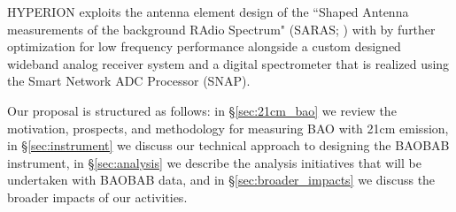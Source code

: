 \documentclass[12pt]{amsart}
\begin{document}
HYPERION exploits the antenna element design of the ``Shaped Antenna measurements of the background RAdio Spectrum" (SARAS; ) with by further optimization for low frequency performance alongside a custom designed wideband analog receiver system and a digital spectrometer that is realized using the Smart Network ADC Processor (SNAP).   




 











Our proposal is structured as follows: 
in \S\ref{sec:21cm_bao} we review the motivation, prospects, and methodology for measuring BAO with 21cm emission,
in \S\ref{sec:instrument} we discuss our technical approach to designing the BAOBAB instrument,
in \S\ref{sec:analysis} we describe the analysis initiatives that will be undertaken with BAOBAB data,
and in \S\ref{sec:broader_impacts} we discuss the broader impacts of our activities.
\end{document}
